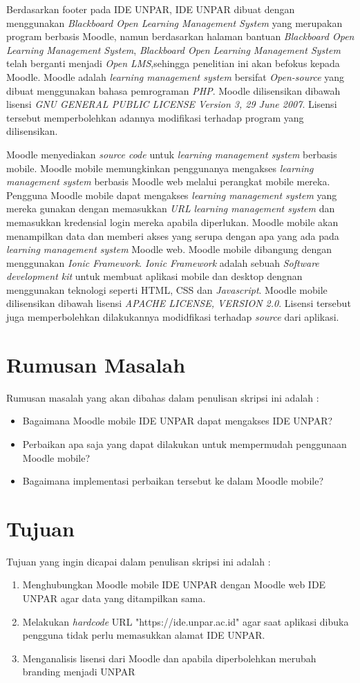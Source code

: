 \documentclass[a4paper,twoside]{article}
\begin{document}
Berdasarkan footer pada IDE UNPAR, IDE UNPAR dibuat dengan menggunakan \textit{Blackboard Open Learning Management System} yang merupakan program berbasis Moodle, namun berdasarkan halaman bantuan \textit{Blackboard Open Learning Management System}, \textit{Blackboard Open Learning Management System} telah berganti menjadi \textit{Open LMS},sehingga penelitian ini akan befokus kepada Moodle. Moodle adalah \textit{learning management system} bersifat \textit{Open-source} yang dibuat menggunakan bahasa pemrograman \textit{PHP}. Moodle dilisensikan dibawah lisensi \textit{GNU GENERAL PUBLIC LICENSE Version 3, 29 June 2007}. Lisensi tersebut memperbolehkan adannya modifikasi terhadap program yang dilisensikan.

Moodle menyediakan \textit{source code} untuk \textit{learning management system} berbasis mobile. Moodle mobile memungkinkan penggunanya mengakses \textit{learning management system} berbasis Moodle web melalui perangkat mobile mereka. Pengguna Moodle mobile dapat mengakses \textit{learning management system} yang mereka gunakan dengan memasukkan \textit{URL} \textit{learning management system} dan memasukkan kredensial login mereka apabila diperlukan. Moodle mobile akan menampilkan data dan memberi akses yang serupa dengan apa yang ada pada \textit{learning management system} Moodle web. Moodle mobile dibangung dengan menggunakan \textit{Ionic Framework}. \textit{Ionic Framework} adalah sebuah \textit{Software development kit} untuk membuat aplikasi mobile dan desktop dengnan menggunakan teknologi seperti HTML, CSS dan \textit{Javascript}. Moodle mobile dilisensikan dibawah lisensi   \textit{APACHE LICENSE, VERSION 2.0}. Lisensi tersebut juga memperbolehkan dilakukannya modidfikasi terhadap \textit{source} dari aplikasi.
\section{Rumusan Masalah}
Rumusan masalah yang akan dibahas dalam penulisan skripsi ini adalah :
\begin{itemize}
	\item Bagaimana Moodle mobile IDE UNPAR dapat mengakses IDE UNPAR?
	\item Perbaikan apa saja yang dapat dilakukan untuk mempermudah penggunaan Moodle mobile?
	\item Bagaimana implementasi perbaikan tersebut ke dalam Moodle mobile?
\end{itemize}
\section{Tujuan}
Tujuan yang ingin dicapai dalam penulisan skripsi ini adalah :
\begin{enumerate}
	\item Menghubungkan Moodle mobile IDE UNPAR dengan Moodle web IDE UNPAR agar data yang ditampilkan sama.
	\item Melakukan \textit{hardcode} URL "https://ide.unpar.ac.id" agar saat aplikasi dibuka pengguna tidak perlu memasukkan alamat IDE UNPAR.
	\item Menganalisis lisensi dari Moodle dan apabila diperbolehkan merubah branding menjadi UNPAR
\end{enumerate}
\end{document}

